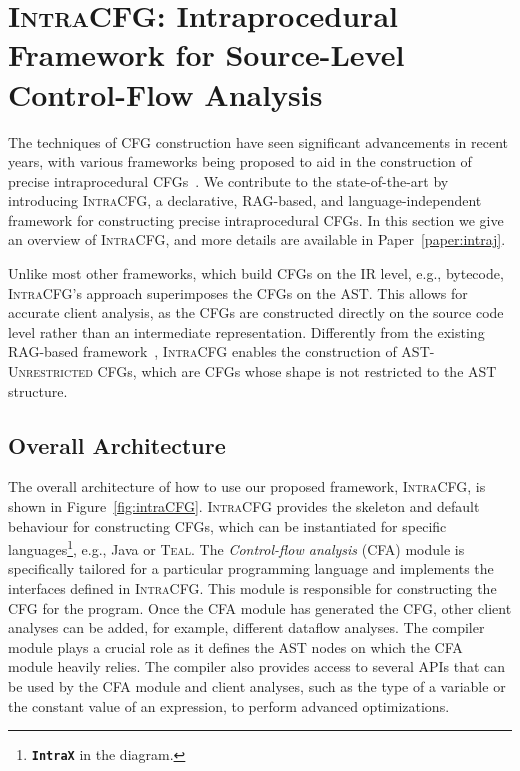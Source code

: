 \section{\textsc{IntraCFG}: Intraprocedural Framework for Source-Level Control-Flow Analysis}%
\label{sec:IntraCFG}
The techniques of CFG construction have seen significant advancements
in recent years, with various frameworks being proposed to aid in the construction
of precise intraprocedural CFGs~\cite{smits2020flowspec,10.1016/j.scico.2012.02.002}.
We contribute to the state-of-the-art by introducing \textsc{IntraCFG}, a declarative, RAG-based,
and language-independent framework for constructing precise intraprocedural CFGs.
In this section we give an overview of \textsc{IntraCFG}, and more details are available
in Paper~\ref{paper:intraj}.

Unlike most other frameworks, which build CFGs on the IR level,
e.g.,  bytecode, \textsc{IntraCFG}'s approach superimposes the CFGs
on the AST. This allows for accurate client analysis,
as the CFGs are constructed directly on the source code level rather than an
intermediate representation.
Differently from the existing RAG-based framework~\cite{10.1016/j.scico.2012.02.002},
\textsc{IntraCFG} enables the construction of \textsc{AST-Unrestricted} CFGs,
which are CFGs whose shape is not restricted to the AST structure.
\subsection{Overall Architecture}
The overall architecture of how to use our proposed framework, \textsc{IntraCFG}, is shown in Figure~\ref{fig:intraCFG}.
\textsc{IntraCFG} provides the skeleton and default behaviour for constructing CFGs,
which can be instantiated for specific languages\footnote{\textbf{\texttt{IntraX}} in the diagram.}, e.g., Java or \textsc{Teal}.
The \emph{Control-flow analysis} (CFA) module is specifically tailored for a particular
programming language and implements the interfaces defined in \textsc{IntraCFG}.
This module is responsible for constructing the CFG for the program.
Once the CFA module has generated the CFG,
other client analyses can be added, for example, different dataflow analyses.
The compiler module plays a crucial role as it defines the AST nodes
on which the CFA module heavily relies. The compiler also provides access to
several APIs that can be used by the CFA module and client analyses, such as
the type of a variable or the constant value of an expression, to perform
advanced optimizations.

